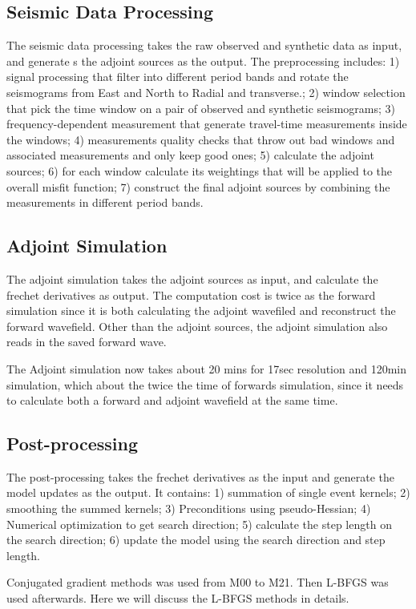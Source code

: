 \documentclass[extra,mreferee]{gji}
\begin{document}
\subsection{Seismic Data Processing}

The seismic data processing takes the raw observed and synthetic data as input, and generate s the adjoint sources as the output. The preprocessing includes: 1) signal processing that  filter into different period bands and rotate the seismograms from East and North to Radial and transverse.; 2) window selection that pick the time window on a pair of observed and synthetic seismograms; 3) frequency-dependent measurement that generate travel-time measurements inside the windows; 4) measurements quality checks that throw out bad windows and associated measurements and only keep good ones; 5) calculate the adjoint sources; 6) for each window calculate its weightings that will be applied to the overall misfit function; 7) construct the final adjoint sources by combining the measurements in different period bands.

\subsection{Adjoint Simulation}
The adjoint simulation takes the adjoint sources as input, and calculate the frechet derivatives as output. The computation cost is twice as the forward simulation since it is both calculating the adjoint wavefiled and reconstruct the forward wavefield. Other than the adjoint sources, the adjoint simulation also reads in the saved forward wave.

The Adjoint simulation now takes about 20 mins for 17sec resolution and 120min simulation, which about the twice the time of forwards simulation, since it needs to calculate both a forward and adjoint wavefield at the same time.

\subsection{Post-processing}
The post-processing takes the frechet derivatives as the input and generate the model updates as the output. It contains: 1) summation of single event kernels; 2) smoothing the summed kernels; 3) Preconditions using pseudo-Hessian; 4) Numerical optimization to get search direction; 5) calculate the step length on the search direction; 6) update the model using the search direction and step length.

Conjugated gradient methods was used from M00 to M21. Then L-BFGS was used afterwards. Here we will discuss the L-BFGS methods in details.
\end{document}
